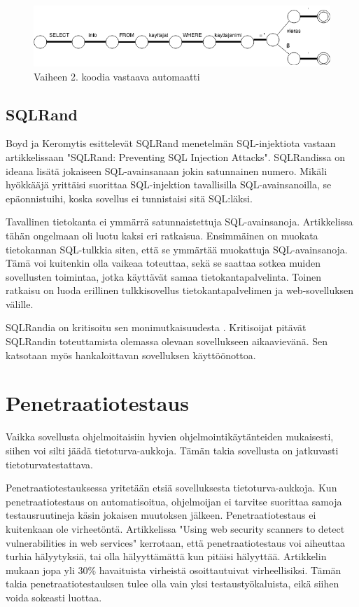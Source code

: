 \documentclass[finnish]{tktltiki2}
\theoremstyle{definition}
\theoremstyle{remark}
\begin{document}
		\begin{figure}[h!]
		\caption{Vaiheen 2. koodia vastaava automaatti}
		\includegraphics[scale=0.5]{kandi}
		\end{figure}
		
	\subsection{SQLRand}
	Boyd ja Keromytis esittelevät SQLRand menetelmän SQL-injektiota vastaan artikkelissaan "SQLRand: Preventing SQL Injection Attacks"\space \cite{sqlrand}. SQLRandissa on ideana lisätä jokaiseen SQL-avainsanaan jokin satunnainen numero. Mikäli hyökkääjä yrittäisi suorittaa SQL-injektion tavallisilla SQL-avainsanoilla, se epäonnistuihi, koska sovellus ei tunnistaisi sitä SQL:läksi.
	
	Tavallinen tietokanta ei ymmärrä satunnaistettuja SQL-avainsanoja. Artikkelissa tähän ongelmaan oli luotu kaksi eri ratkaisua. Ensimmäinen on muokata tietokannan SQL-tulkkia siten, että se ymmärtää muokattuja SQL-avainsanoja. Tämä voi kuitenkin olla vaikeaa toteuttaa, sekä se saattaa sotkea muiden sovellusten toimintaa, jotka käyttävät samaa tietokantapalvelinta. Toinen ratkaisu on luoda erillinen tulkkisovellus tietokantapalvelimen ja web-sovelluksen välille.
	
	SQLRandia on kritisoitu sen monimutkaisuudesta \cite{prepared}. Kritisoijat pitävät SQLRandin toteuttamista olemassa olevaan sovellukseen aikaavievänä. Sen katsotaan myös hankaloittavan sovelluksen käyttöönottoa.
	\section{Penetraatiotestaus}
	
	 Vaikka sovellusta ohjelmoitaisiin hyvien ohjelmointikäytänteiden mukaisesti, siihen voi silti jäädä tietoturva-aukkoja. Tämän takia sovellusta on jatkuvasti tietoturvatestattava. 
	 
	 Penetraatiotestauksessa yritetään etsiä sovelluksesta tietoturva-aukkoja. Kun penetraatiotestaus on automatisoitua, ohjelmoijan ei tarvitse suorittaa samoja testausruutineja käsin jokaisen muutoksen jälkeen. Penetraatiotestaus ei kuitenkaan ole virheetöntä. Artikkelissa "Using web security scanners to detect vulnerabilities in web services" \cite{detection} kerrotaan, että penetraatiotestaus voi aiheuttaa turhia hälyytyksiä, tai olla hälyyttämättä kun pitäisi hälyyttää. Artikkelin mukaan jopa yli 30\% havaituista virheistä osoittautuivat virheellisiksi. Tämän takia penetraatiotestauksen tulee olla vain yksi testaustyökaluista, eikä siihen voida sokeasti luottaa.
	 
\end{document}
